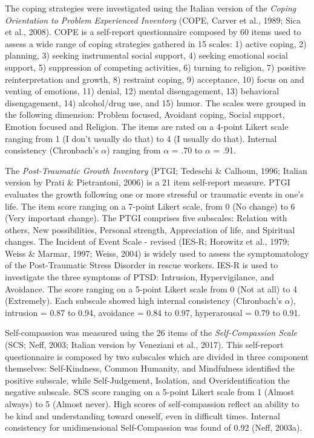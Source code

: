 \documentclass[
  english,
  man,floatsintext]{apa7}
\begin{document}
The coping strategies were investigated using the Italian version of the \emph{Coping Orientation to Problem Experienced Inventory} (COPE, Carver et al., 1989; Sica et al., 2008).
COPE is a self-report questionnaire composed by 60 items used to assess a wide range of coping strategies gathered in 15 scales: 1) active coping, 2) planning, 3) seeking instrumental social support, 4) seeking emotional social support, 5) suppression of competing activities, 6) turning to religion, 7) positive reinterpretation and growth, 8) restraint coping, 9) acceptance, 10) focus on and venting of emotions, 11) denial, 12) mental disengagement, 13) behavioral disengagement, 14) alcohol/drug use, and 15) humor.
The scales were grouped in the following dimension: Problem focused, Avoidant coping, Social support, Emotion focused and Religion.
The items are rated on a 4-point Likert scale ranging from 1 (I don't usually do that) to 4 (I usually do that).
Internal consistency (Chronbach's \(\alpha\)) ranging from \(\alpha\) = .70 to \(\alpha\) = .91.

The \emph{Post-Traumatic Growth Inventory} (PTGI; Tedeschi \& Calhoun, 1996; Italian version by Prati \& Pietrantoni, 2006) is a 21 item self-report measure.
PTGI evaluates the growth following one or more stressful or traumatic events in one's life.
The item score ranging on a 7-point Likert scale, from 0 (No change) to 6 (Very important change).
The PTGI comprises five subscales: Relation with others, New possibilities, Personal strength, Appreciation of life, and Spiritual changes.
The Incident of Event Scale - revised (IES-R; Horowitz et al., 1979; Weiss \& Marmar, 1997; Weiss, 2004) is widely used to assess the symptomatology of the Post-Traumatic Stress Disorder in rescue workers.
IES-R is used to investigate the three symptoms of PTSD: Intrusion, Hypervigilance, and Avoidance.
The score ranging on a 5-point Likert scale from 0 (Not at all) to 4 (Extremely).
Each subscale showed high internal consistency (Chronbach's \(\alpha\)), intrusion = 0.87 to 0.94, avoidance = 0.84 to 0.97, hyperarousal = 0.79 to 0.91.

Self-compassion was measured using the 26 items of the \emph{Self-Compassion Scale} (SCS; Neff, 2003; Italian version by Veneziani et al., 2017).
This self-report questionnaire is composed by two subscales which are divided in three component themselves: Self-Kindness, Common Humanity, and Mindfulness identified the positive subscale, while Self-Judgement, Isolation, and Overidentification the negative subscale.
SCS score ranging on a 5-point Likert scale from 1 (Almost always) to 5 (Almost never).
High scores of self-compassion reflect an ability to be kind and understanding toward oneself, even in difficult times.
Internal consistency for unidimensional Self-Compassion was found of 0.92 (Neff, 2003a).
\end{document}
